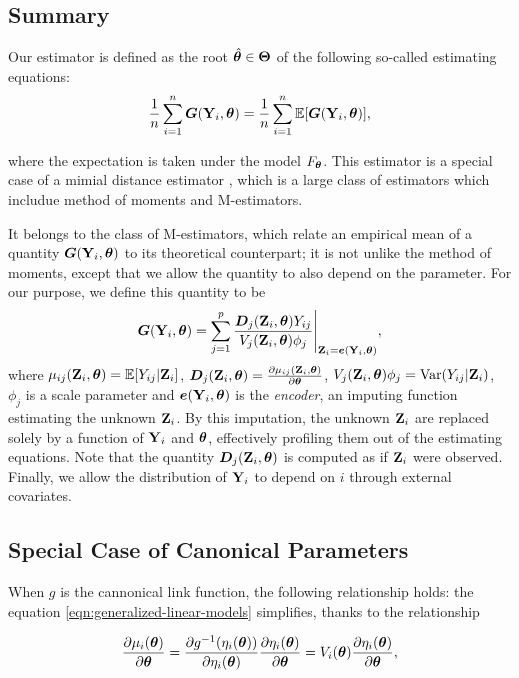 \documentclass[twoside,11pt]{article}
\newcommand{\gb}[2][]{\todo[color=gbcolor, caption={GB}, #1]{#2}}
\begin{document}
\subsection{Summary}
Our estimator is defined as the root $\hat{{\bm{\theta}}}\in\bm\Theta$ of the following so-called estimating equations:
%
\begin{equation}
    \frac{1}{n}\sum_{i=1}^n \bm G({\bf Y}_i, {\bm{\theta}}) = \frac{1}{n}\sum_{i=1}^n \mathbb{E}[\bm G({\bf Y}_i, {\bm{\theta}})],
\end{equation}

%
where the expectation is taken under the model $F_{{\bm{\theta}}}$. This estimator is a special case of a mimial distance estimator \gb{cite}, which is a large class of estimators which includue method of moments and M-estimators. 

It belongs to the class of M-estimators, which relate an empirical mean of a quantity $\bm G({\bf Y}_i, {\bm{\theta}})$ to its theoretical counterpart\gb{cite something}; it is not unlike the method of moments, except that we allow the quantity to also depend on the parameter. For our purpose, we define this quantity to be
%
\begin{equation}
    \bm G({\bf Y}_i, {\bm{\theta}}) = \sum_{j=1}^p \frac{\bm D_j({\bf Z}_i, {\bm{\theta}}) Y_{ij}}{V_j({\bf Z}_i, {\bm{\theta}})\phi_j}\Bigg\vert_{{\bf Z}_i={\bm e}({\bf Y}_i, {\bm{\theta}})},
\end{equation}
%
where $\mu_{ij}({\bf Z}_i, {\bm{\theta}}) = \mathbb{E}[Y_{ij}|{\bf Z}_i]$, $\bm D_j({\bf Z}_i, {\bm{\theta}}) = \frac{\partial \mu_{ij}({\bf Z}_i, {\bm{\theta}})}{\partial{\bm{\theta}}} $, $V_j({\bf Z}_i, {\bm{\theta}})\phi_j = \text{Var}(Y_{ij}|{\bf Z}_i)$, $\phi_j$ is a scale parameter and ${\bm e}({\bf Y}_i, {\bm{\theta}})$ is the \textit{encoder}, an imputing function estimating the unknown ${\bf Z}_i$. By this imputation, the unknown ${\bf Z}_i$ are replaced solely by a function of ${\bf Y}_i$ and ${\bm{\theta}}$, effectively profiling them out of the estimating equations. Note that the quantity $\bm D_j({\bf Z}_i, {\bm{\theta}})$ is computed as if ${\bf Z}_i$ were observed. Finally, we allow the distribution of ${\bf Y}_i$ to depend on $i$ through external covariates.


\subsection{Special Case of Canonical Parameters}
When $g$ is the cannonical link function, the following relationship holds:
the equation  \eqref{eqn:generalized-linear-models} simplifies, thanks to the relationship

$$
\frac{\partial \mu_i({\bm{\theta}})}{\partial{\bm{\theta}}} = \frac{\partial g^{-1}(\eta_i({\bm{\theta}}))}{\partial \eta_i({\bm{\theta}})}\frac{\partial \eta_i({\bm{\theta}})}{\partial{\bm{\theta}}} = V_i({\bm{\theta}})\frac{\partial \eta_i({\bm{\theta}})}{\partial{\bm{\theta}}},
$$
\end{document}
